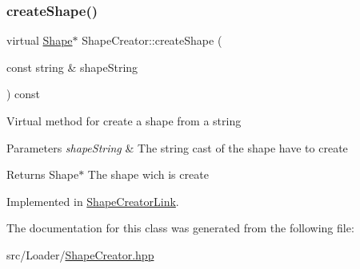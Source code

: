 \subsubsection{\texorpdfstring{create\+Shape()}{createShape()}}
{\footnotesize\ttfamily virtual \hyperlink{class_shape}{Shape}$\ast$ Shape\+Creator\+::create\+Shape (\begin{DoxyParamCaption}\item[{const string \&}]{shape\+String }\end{DoxyParamCaption}) const\hspace{0.3cm}{\ttfamily [pure virtual]}}

Virtual method for create a shape from a string 
\begin{DoxyParams}{Parameters}
{\em shape\+String} & The string cast of the shape have to create \\
\hline
\end{DoxyParams}
\begin{DoxyReturn}{Returns}
Shape$\ast$ The shape wich is create 
\end{DoxyReturn}


Implemented in \hyperlink{class_shape_creator_link_af372255e987c8fa587620e16dd406ccc}{Shape\+Creator\+Link}.



The documentation for this class was generated from the following file\+:\begin{DoxyCompactItemize}
\item 
src/\+Loader/\hyperlink{_shape_creator_8hpp}{Shape\+Creator.\+hpp}\end{DoxyCompactItemize}
